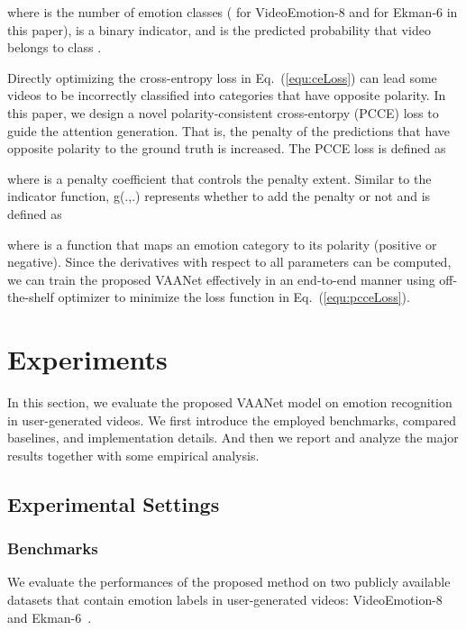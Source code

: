 \documentclass[letterpaper]{article} \usepackage{aaai20}  \usepackage{times}  \usepackage{helvet} \usepackage{courier}  \usepackage[hyphens]{url}  \usepackage{graphicx} \urlstyle{rm} \def\UrlFont{\rm}  \usepackage{graphicx}
\begin{document}
where  is the number of emotion classes ( for VideoEmotion-8 and  for Ekman-6 in this paper),  is a binary indicator, and  is the predicted probability that video  belongs to class .





Directly optimizing the cross-entropy loss in Eq.~(\ref{equ:ceLoss}) can lead some videos to be incorrectly classified into categories that have opposite polarity.
In this paper, we design a novel polarity-consistent cross-entorpy (PCCE) loss to guide the attention generation. That is, the penalty of the predictions that have opposite polarity to the ground truth is increased. The PCCE loss is defined as

where  is a penalty coefficient that controls the penalty extent. Similar to the indicator function, g(.,.) represents whether to add the penalty or not and is defined as

where  is a function that maps an emotion category to its polarity (positive or negative). Since the derivatives with respect to all parameters can be computed, we can train the proposed VAANet effectively in an end-to-end manner using off-the-shelf optimizer to minimize the loss function in Eq.~(\ref{equ:pcceLoss}).




\section{Experiments}
\label{sec:Experiments}

In this section, we evaluate the proposed VAANet model on emotion recognition in user-generated videos. We first introduce the employed benchmarks, compared baselines, and implementation details. And then we report and analyze the major results together with some empirical analysis.


\subsection{Experimental Settings}
\label{ssec:Settings}

\subsubsection{Benchmarks}
\label{sssec:Benchmarks}
We evaluate the performances of the proposed method on two publicly available datasets that contain emotion labels in user-generated videos: VideoEmotion-8~\cite{jiang2014predicting} and Ekman-6~\cite{xu2018heterogeneous}.
\end{document}
